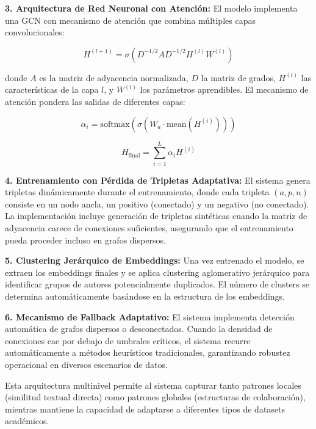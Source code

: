 \documentclass{article}
\begin{document}
\textbf{3. Arquitectura de Red Neuronal con Atención:}
El modelo implementa una GCN con mecanismo de atención que combina múltiples capas convolucionales:

\begin{equation}
H^{(l+1)} = \sigma(D^{-1/2}AD^{-1/2}H^{(l)}W^{(l)})
\end{equation}

donde $A$ es la matriz de adyacencia normalizada, $D$ la matriz de grados, $H^{(l)}$ las características de la capa $l$, y $W^{(l)}$ los parámetros aprendibles. El mecanismo de atención pondera las salidas de diferentes capas:

\begin{equation}
\alpha_i = \text{softmax}(\sigma(W_a \cdot \text{mean}(H^{(i)})))
\end{equation}

\begin{equation}
H_{\text{final}} = \sum_{i=1}^{L} \alpha_i H^{(i)}
\end{equation}

\textbf{4. Entrenamiento con Pérdida de Tripletas Adaptativa:}
El sistema genera tripletas dinámicamente durante el entrenamiento, donde cada tripleta $(a, p, n)$ consiste en un nodo ancla, un positivo (conectado) y un negativo (no conectado). La implementación incluye generación de tripletas sintéticas cuando la matriz de adyacencia carece de conexiones suficientes, asegurando que el entrenamiento pueda proceder incluso en grafos dispersos.

\textbf{5. Clustering Jerárquico de Embeddings:}
Una vez entrenado el modelo, se extraen los embeddings finales y se aplica clustering aglomerativo jerárquico para identificar grupos de autores potencialmente duplicados. El número de clusters se determina automáticamente basándose en la estructura de los embeddings.

\textbf{6. Mecanismo de Fallback Adaptativo:}
El sistema implementa detección automática de grafos dispersos o desconectados. Cuando la densidad de conexiones cae por debajo de umbrales críticos, el sistema recurre automáticamente a métodos heurísticos tradicionales, garantizando robustez operacional en diversos escenarios de datos.

Esta arquitectura multinivel permite al sistema capturar tanto patrones locales (similitud textual directa) como patrones globales (estructuras de colaboración), mientras mantiene la capacidad de adaptarse a diferentes tipos de datasets académicos.
\end{document}
